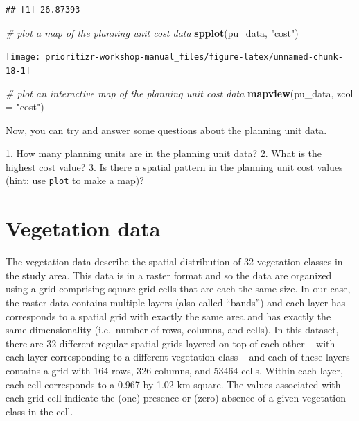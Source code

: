 \documentclass[12pt,]{book}
\makeatletter
\newenvironment{Shaded}{\begin{snugshade}}{\end{snugshade}}
\newcommand{\KeywordTok}[1]{\textcolor[rgb]{0.13,0.29,0.53}{\textbf{#1}}}
\newcommand{\DataTypeTok}[1]{\textcolor[rgb]{0.13,0.29,0.53}{#1}}
\newcommand{\StringTok}[1]{\textcolor[rgb]{0.31,0.60,0.02}{#1}}
\newcommand{\CommentTok}[1]{\textcolor[rgb]{0.56,0.35,0.01}{\textit{#1}}}
\newcommand{\NormalTok}[1]{#1}
\newenvironment{kframe}{%
\medskip{}
\setlength{\fboxsep}{.8em}
 \def\at@end@of@kframe{}%
 \ifinner\ifhmode%
  \def\at@end@of@kframe{\end{minipage}}%
  \begin{minipage}{\columnwidth}%
 \fi\fi%
 \def\FrameCommand##1{\hskip\@totalleftmargin \hskip-\fboxsep
 \colorbox{shadecolor}{##1}\hskip-\fboxsep
     \hskip-\linewidth \hskip-\@totalleftmargin \hskip\columnwidth}%
 \MakeFramed {\advance\hsize-\width
   \@totalleftmargin\z@ \linewidth\hsize
   \@setminipage}}%
 {\par\unskip\endMakeFramed%
 \at@end@of@kframe}
\newenvironment{rmdblock}[1]
  {
  \begin{itemize}
  \renewcommand{\labelitemi}{
    \raisebox{-.7\height}[0pt][0pt]{
      {\setkeys{Gin}{width=3em,keepaspectratio}\texttt{[image: images/\#1]}}
    }
  }
  \setlength{\fboxsep}{1em}
  \begin{kframe}
  \item
  }
  {
  \end{kframe}
  \end{itemize}
  }
\newenvironment{rmdquestion}
  {\begin{rmdblock}{question}}
  {\end{rmdblock}}
\makeatother
\begin{document}
\begin{verbatim}
## [1] 26.87393
\end{verbatim}

\begin{Shaded}
\begin{Highlighting}[]
\CommentTok{# plot a map of the planning unit cost data}
\KeywordTok{spplot}\NormalTok{(pu_data, }\StringTok{"cost"}\NormalTok{)}
\end{Highlighting}
\end{Shaded}

\begin{center}\texttt{[image: prioritizr-workshop-manual\_files/figure-latex/unnamed-chunk-18-1]} \end{center}

\begin{Shaded}
\begin{Highlighting}[]
\CommentTok{# plot an interactive map of the planning unit cost data}
\KeywordTok{mapview}\NormalTok{(pu_data, }\DataTypeTok{zcol =} \StringTok{"cost"}\NormalTok{)}
\end{Highlighting}
\end{Shaded}

Now, you can try and answer some questions about the planning unit data.

\begin{rmdquestion} 1. How many planning units are in the
planning unit data? 2. What is the highest cost value? 3. Is there a
spatial pattern in the planning unit cost values (hint: use
\texttt{plot} to make a map)?
\end{rmdquestion}

\clearpage

\section{Vegetation data}\label{vegetation-data}

The vegetation data describe the spatial distribution of 32 vegetation
classes in the study area. This data is in a raster format and so the
data are organized using a grid comprising square grid cells that are
each the same size. In our case, the raster data contains multiple
layers (also called ``bands'') and each layer has corresponds to a
spatial grid with exactly the same area and has exactly the same
dimensionality (i.e.~number of rows, columns, and cells). In this
dataset, there are 32 different regular spatial grids layered on top of
each other -- with each layer corresponding to a different vegetation
class -- and each of these layers contains a grid with 164 rows, 326
columns, and 53464 cells. Within each layer, each cell corresponds to a
0.967 by 1.02 km square. The values associated with each grid cell
indicate the (one) presence or (zero) absence of a given vegetation
class in the cell.
\end{document}

